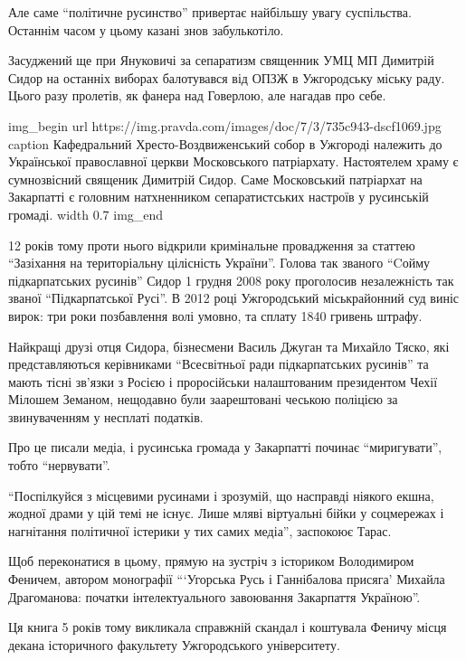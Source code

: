 Але саме \enquote{політичне русинство} привертає найбільшу увагу суспільства. Останнім
часом у цьому казані знов забулькотіло.

Засуджений ще при Януковичі за сепаратизм священник УМЦ МП Димитрій Сидор на
останніх виборах балотувався від ОПЗЖ в Ужгородську міську раду. Цього разу
пролетів, як фанера над Говерлою, але нагадав про себе.

\ifcmt
img_begin 
        url https://img.pravda.com/images/doc/7/3/735c943-dscf1069.jpg
        caption Кафедральний Хресто-Воздвиженський собор в Ужгороді належить до Української православної церкви Московського патріархату. Настоятелем храму є сумнозвісний священик Димитрій Сидор. Саме Московський патріархат на Закарпатті є головним натхненником сепаратистських настроїв у русинській громаді.
        width 0.7
img_end
\fi

12 років тому проти нього відкрили кримінальне провадження за статтею
\enquote{Зазіхання на територіальну цілісність України}. Голова так званого \enquote{Cойму
підкарпатських русинів} Сидор 1 грудня 2008 року проголосив незалежність так
званої \enquote{Підкарпатської Русі}. В 2012 році Ужгородський міськрайонний суд виніс
вирок: три роки позбавлення волі \dshM умовно, та сплату 1840 гривень штрафу.

Найкращі друзі отця Сидора, бізнесмени Василь Джуган та Михайло Тяско, які
представляються керівниками \enquote{Всесвітньої ради підкарпатських русинів} та мають
тісні зв'язки з Росією і проросійськи налаштованим президентом Чехії Мілошем
Земаном, нещодавно були заарештовані чеською поліцією за звинуваченням у
несплаті податків.

Про це писали медіа, і русинська громада у Закарпатті починає \enquote{миригувати},
тобто \enquote{нервувати}.

\enquote{Поспілкуйся з місцевими русинами і зрозумій, що насправді ніякого екшна,
жодної драми у цій темі не існує. Лише мляві віртуальні бійки у соцмережах і
нагнітання політичної істерики у тих самих медіа}, \dshM заспокоює Тарас.

Щоб переконатися в цьому, прямую на зустріч з істориком Володимиром Феничем,
автором монографії \enquote{\enquote{Угорська Русь і Ганнібалова присяга} Михайла Драгоманова:
початки інтелектуального завоювання Закарпаття Україною}.

Ця книга 5 років тому викликала справжній скандал і коштувала Феничу місця
декана історичного факультету Ужгородського університету. 


